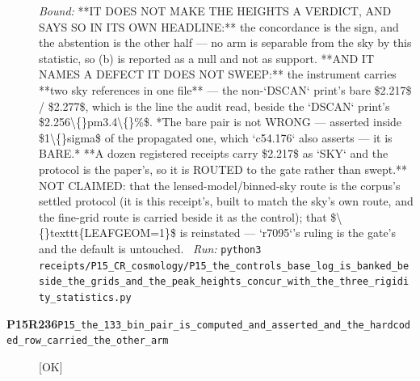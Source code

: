 \begin{description}
 \emph{Bound:}  **IT DOES NOT MAKE THE HEIGHTS A VERDICT, AND SAYS SO IN ITS OWN HEADLINE:** the concordance is the sign, and the abstention is the other half --- no arm is separable from the sky by this statistic, so (b) is reported as a null and not as support.  **AND IT NAMES A DEFECT IT DOES NOT SWEEP:** the instrument carries **two sky references in one file** --- the non-`DSCAN` print's bare \$2.217\$ / \$2.277\$, which is the line the audit read, beside the `DSCAN` print's \$2.256\textbackslash\{\}pm3.4\textbackslash\{\}\%\$. *The bare pair is not WRONG --- asserted inside \$1\textbackslash\{\}sigma\$ of the propagated one, which `c54.176` also asserts --- it is BARE.* **A dozen registered receipts carry \$2.217\$ as `SKY` and the protocol is the paper's, so it is ROUTED to the gate rather than swept.** NOT CLAIMED: that the lensed-model/binned-sky route is the corpus's settled protocol (it is this receipt's, built to match the sky's own route, and the fine-grid route is carried beside it as the control); that \$\textbackslash\{\}texttt\{LEAFGEOM=1\}\$ is reinstated --- `r7095`'s ruling is the gate's and the default is untouched.
\ \emph{Run:} \texttt{python3 receipts/P15\_CR\_cosmology/P15\_the\_controls\_base\_log\_is\_banked\_beside\_the\_grids\_and\_the\_peak\_heights\_concur\_with\_the\_three\_rigidity\_statistics.py}
\item[\rcptlabel{P15_the_133_bin_pair_is_computed_and_asserted_and_the_hardcoded_row_carried_the_other_arm}{P15R236}\textbf{P15R236}\quad\texttt{P15\_the\_133\_bin\_pair\_is\_computed\_and\_asserted\_and\_the\_hardcoded\_row\_carried\_the\_other\_arm}]\hfill\textsf{[OK]}\\

\end{description}
